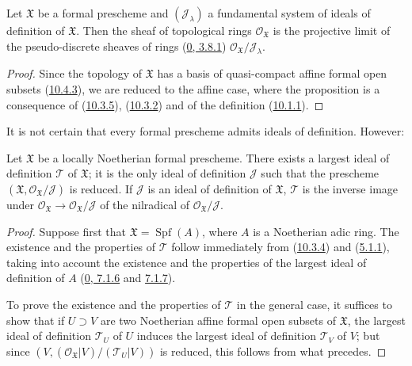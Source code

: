 \begin{proposition}[10.5.3]
\label{I.10.5.3}
Let $\mathfrak{X}$ be a formal prescheme and $(\mathscr{J}_\lambda)$ a
fundamental system of ideals of definition of $\mathfrak{X}$. Then the
sheaf of topological rings $\mathscr{O}_{\mathfrak{X}}$ is the projective
limit of the pseudo-discrete sheaves of rings
(\hyperref[0.3.8.1]{0, 3.8.1})
$\mathscr{O}_{\mathfrak{X}}/\mathscr{J}_\lambda$.
\end{proposition}

\begin{proof}
Since the topology of $\mathfrak{X}$ has a basis of quasi-compact affine
formal open subsets (\hyperref[I.10.4.3]{10.4.3}), we are reduced to the
affine case, where the proposition is a consequence of
(\hyperref[I.10.3.5]{10.3.5}),
(\hyperref[I.10.3.2]{10.3.2}) and of the definition
(\hyperref[I.10.1.1]{10.1.1}).
\end{proof}

It is not certain that every formal prescheme admits ideals of
definition. However:

\begin{proposition}[10.5.4]
\label{I.10.5.4}
Let $\mathfrak{X}$ be a locally Noetherian formal prescheme. There exists
a largest ideal of definition $\mathscr{T}$ of $\mathfrak{X}$;
it is the only ideal of definition $\mathscr{J}$ such that the prescheme
$(\mathfrak{X},\mathscr{O}_{\mathfrak{X}}/\mathscr{J})$ is reduced. If
$\mathscr{J}$ is an ideal of definition of $\mathfrak{X}$,
$\mathscr{T}$ is the inverse image under
$\mathscr{O}_{\mathfrak{X}}\to
\mathscr{O}_{\mathfrak{X}}/\mathscr{J}$ of the nilradical of
$\mathscr{O}_{\mathfrak{X}}/\mathscr{J}$.
\end{proposition}

\begin{proof}
Suppose first that $\mathfrak{X}=\operatorname{Spf}(A)$, where $A$ is
a Noetherian adic ring. The existence and the properties of
$\mathscr{T}$ follow immediately from
(\hyperref[I.10.3.4]{10.3.4}) and
(\hyperref[I.5.1.1]{5.1.1}), taking into account the existence and the
properties of the largest ideal of definition of $A$
(\hyperref[0.7.1.6]{0, 7.1.6} and
\hyperref[0.7.1.7]{7.1.7}).

To prove the existence and the properties of $\mathscr{T}$ in the general
case, it suffices to show that if $U\supset V$ are two Noetherian affine
formal open subsets of $\mathfrak{X}$, the largest ideal of
definition $\mathscr{T}_U$ of $U$ induces the largest ideal of definition
$\mathscr{T}_V$ of $V$; but since
$(V,(\mathscr{O}_{\mathfrak{X}}|V)/(\mathscr{T}_U|V))$ is reduced, this
follows from what precedes.
\end{proof}


